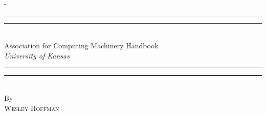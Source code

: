 %
%
%
%
%
\begin{titlingpage}
\begin{SingleSpace}
\calccentering{\unitlength}
\begin{adjustwidth*}{\unitlength}{-\unitlength}
\vspace*{13mm}
\begin{center}
\rule[0.5ex]{\linewidth}{2pt}\vspace*{-\baselineskip}\vspace*{3.2pt}
\rule[0.5ex]{\linewidth}{1pt}\\[\baselineskip]
{\HUGE Association for Computing Machinery Handbook }\\[4mm]
{\Large \textit{University of Kansas}}\\
\rule[0.5ex]{\linewidth}{1pt}\vspace*{-\baselineskip}\vspace{3.2pt}
\rule[0.5ex]{\linewidth}{2pt}\\
\vspace{6.5mm}
{\large By}\\
\vspace{6.5mm}
{\large\textsc{Wesley Hoffman}}\\
\vspace{11mm}

\end{center}
\end{adjustwidth*}
\end{SingleSpace}
\end{titlingpage}

